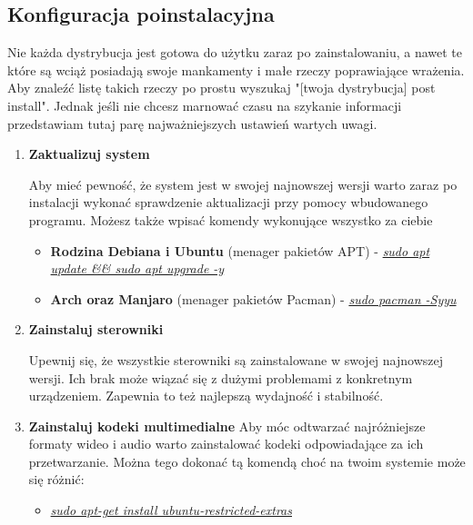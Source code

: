 \documentclass[10pt,a4paper]{article}
\begin{document}
\subsection{Konfiguracja poinstalacyjna}	

Nie każda dystrybucja jest gotowa do użytku zaraz po zainstalowaniu, a nawet te które są wciąż posiadają swoje mankamenty i małe rzeczy poprawiające wrażenia. Aby znaleźć listę takich rzeczy po prostu wyszukaj "[twoja dystrybucja] post install". Jednak jeśli nie chcesz marnować czasu na szykanie informacji przedstawiam tutaj parę najważniejszych ustawień wartych uwagi.

\begin{enumerate}

\item \textbf{Zaktualizuj system} \par Aby mieć pewność, że system jest w swojej najnowszej wersji warto zaraz po instalacji wykonać sprawdzenie aktualizacji przy pomocy wbudowanego programu. Możesz także wpisać komendy wykonujące wszystko za ciebie
\begin{itemize}
\item \textbf{Rodzina Debiana i Ubuntu} (menager pakietów APT) - \textsl{\underline{sudo apt update \&\& sudo apt upgrade -y}}
\item \textbf{Arch oraz Manjaro} (menager pakietów Pacman) - \textsl{\underline{sudo pacman -Syyu}}\\
\end{itemize}

\item \textbf{Zainstaluj sterowniki}\par Upewnij się, że wszystkie sterowniki są zainstalowane w swojej najnowszej wersji. Ich brak może wiązać się z dużymi problemami z konkretnym urządzeniem. Zapewnia to też najlepszą wydajność i stabilność.\\

\item \textbf{Zainstaluj kodeki multimedialne} Aby móc odtwarzać najróżniejsze formaty wideo i audio warto zainstalować kodeki odpowiadające za ich przetwarzanie. Można tego dokonać tą komendą choć na twoim systemie może się różnić:
\begin{itemize}
\item \textsl{\underline{sudo apt-get install ubuntu-restricted-extras}}\\
\end{itemize}


\end{enumerate}
\end{document}

